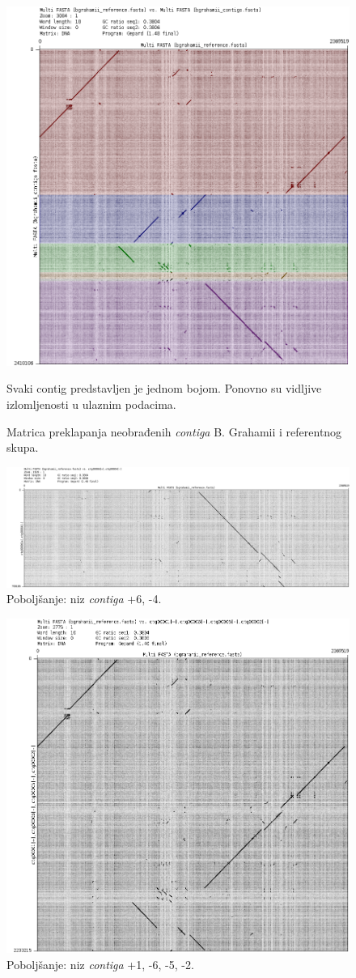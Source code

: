\documentclass[times, utf8, seminar, numeric]{fer}
\begin{document}
\begin{figure}[h]
	\centering
	\centerline{\includegraphics[width=0.6\linewidth]{img/bh_contigs}}
	\caption{Matrica preklapanja neobrađenih \textit{contiga} B. Grahamii i referentnog skupa.}
	\label{fig:bhcontigs}
	\small
	Svaki contig predstavljen je jednom bojom. Ponovno su vidljive izlomljenosti u ulaznim podacima.
\end{figure}

\begin{figure}[h]
	\centering
	\centerline{\includegraphics[width=0.6\linewidth]{img/bh_6_4}}
	\caption{Poboljšanje: niz \textit{contiga} +6, -4.}
	\label{fig:bh64}
\end{figure}

\begin{figure}[h]
	\centering
	\centerline{\includegraphics[width=0.6\linewidth]{img/bh_1_6_2}}
	\caption{Poboljšanje: niz \textit{contiga} +1, -6, -5, -2.}
	\label{fig:bh162}
\end{figure}
\end{document}
